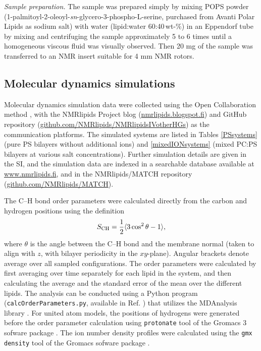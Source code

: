 \documentclass[aps,prl,superscriptaddress,twocolumn]{revtex4}
\begin{document}
\emph{Sample preparation.}
The sample was prepared simply by mixing POPS powder (1-palmitoyl-2-oleoyl-{\it sn}-glycero-3-phospho-L-serine, purchased from Avanti Polar Lipids
as sodium salt) with water (lipid:water 60:40\,wt-\%) in an Eppendorf tube by mixing and centrifuging the sample approximately 5 to 6 times
until a homogeneous viscous fluid was visually observed. Then 20 mg of the sample was transferred to an NMR insert suitable for 4 mm NMR rotors.  


\subsection{Molecular dynamics simulations}
Molecular dynamics simulation data were collected using
the Open Collaboration method \cite{botan15}, with
the NMR\-lipids Project blog (\url{nmrlipids.blogspot.fi}) and
GitHub repository (\url{github.com/NMRlipids/NMRlipidsIVotherHGs})
as the communication platforms.
The simulated systems are listed in 
Tables \ref{PSsystems} (pure PS bilayers without additional ions) 
and \ref{mixedIONsystems} (mixed PC:PS bilayers at various salt concentrations).
Further simulation details are given in the SI, and
the simulation data are indexed in a
searchable database available at \url{www.nmrlipids.fi},
and in the NMRlipids/MATCH repository (\url{github.com/NMRlipids/MATCH}).

The C--H bond order parameters were calculated directly
from the carbon and hydrogen positions using the definition
\begin{equation}
S_{\rm CH}=\frac{1}{2}\langle 3\cos^2\theta -1 \rangle,
\end{equation}
where $\theta$ is the angle between the C--H bond and the membrane normal
(taken to align with $z$, with bilayer periodicity in the $xy$-plane).
Angular brackets denote average over all sampled configurations.
The order parameters were calculated by first averaging over time separately
for each lipid in the system, and then calculating the average and
the standard error of the mean over the different lipids. The analysis can be conducted using a
Python program ({\tt calcOrderParameters.py}, available in Ref. ) that utilizes the
MDAnalysis library \cite{agrawal11,gowers16}.
For united atom models, the positions of hydrogens were generated before the order parameter calculation using {\tt protonate} tool
of the Gromacs 3 sofware package \cite{gromacsMANUAL}.
The ion number density profiles were calculated using the {\tt gmx density} tool
of the Gromacs sofware package \cite{gromacsMANUAL}.
\end{document}

